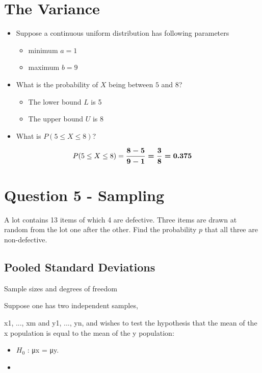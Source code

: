 \documentclass[]{report}
\begin{document}
{

{\section{The Variance}
\begin{itemize}
\item Suppose a continuous uniform distribution has following parameters
\begin{itemize}
\item minimum $a=1$
\item maximum $b=9$
\end{itemize}
\item What is the probability of $X$ being between $5$ and $8$?
\begin{itemize}\item The lower bound $L$ is 5
\item The upper bound $U$ is 8
\end{itemize}
\item What is $P( 5 \leq X \leq 8 )$?
\end{itemize}
\[
P( 5 \leq X \leq 8 ) = \boldsymbol{{ 8 - 5 \over 9 - 1} = { 3 \over 8} = 0.375}
\]
}








\section*{Question 5 - Sampling}
A lot contains 13 items of which 4 are defective. Three items are drawn at random from the lot one after the other. Find the probability $p$ that all three are non-defective.

\subsection{Pooled Standard Deviations}

Sample sizes and degrees of freedom


Suppose one has two independent samples,

x1, ..., xm and y1, ..., yn, and wishes
to test the hypothesis that the mean of the
x population is equal to the mean
of the y population:

\begin{itemize}
\item $H_0$ : μx = μy.
\item 
\end{itemize}

}
\end{document}
